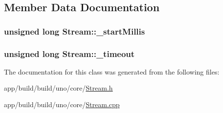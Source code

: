 \subsection{Member Data Documentation}
\hypertarget{class_stream_abf61d2006d28d18f2e028285a323fe5a}{
\subsubsection[{\-\_\-start\-Millis}]{\setlength{\rightskip}{0pt plus 5cm}unsigned long Stream\-::\-\_\-start\-Millis\hspace{0.3cm}{\ttfamily [protected]}}}\label{class_stream_abf61d2006d28d18f2e028285a323fe5a}
\hypertarget{class_stream_aae48f1a926d2e82a452f2c75af0c6a29}{
\subsubsection[{\-\_\-timeout}]{\setlength{\rightskip}{0pt plus 5cm}unsigned long Stream\-::\-\_\-timeout\hspace{0.3cm}{\ttfamily [protected]}}}\label{class_stream_aae48f1a926d2e82a452f2c75af0c6a29}


The documentation for this class was generated from the following files\-:\begin{DoxyCompactItemize}
\item 
app/build/build/uno/core/\hyperlink{_stream_8h}{Stream.\-h}\item 
app/build/build/uno/core/\hyperlink{_stream_8cpp}{Stream.\-cpp}\end{DoxyCompactItemize}
